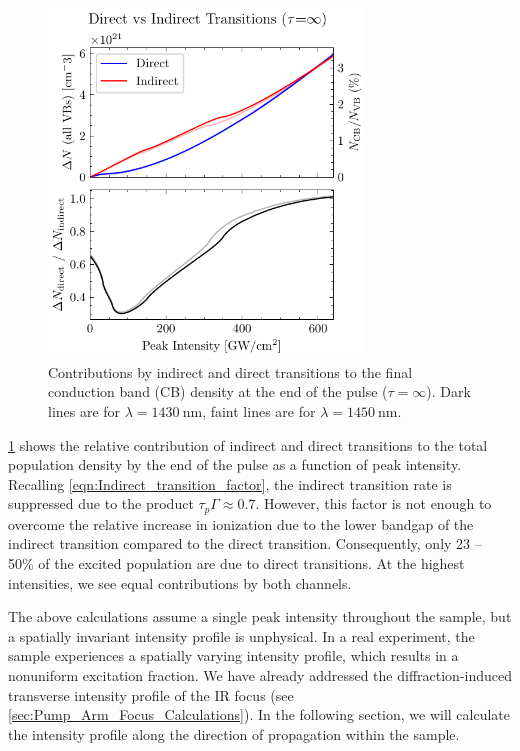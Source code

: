 \begin{figure}
	\centering
	\includegraphics[width=0.75\textwidth]{figures/chap4/Direct_vs_Indirect_Trans.pdf}
	\caption{Contributions by indirect and direct transitions to the final conduction band (CB) density at the end of the pulse ($\tau = \infty$). Dark lines are for $\lambda = 1430 \ \textrm{nm}$, faint lines are for $\lambda = 1450 \ \textrm{nm}$.}
	\label{fig:Direct_vs_Indirect_Trans}
\end{figure}

\cref{fig:Direct_vs_Indirect_Trans} shows the relative contribution of indirect and direct transitions to the total population density by the end of the pulse as a function of peak intensity. Recalling \cref{eqn:Indirect_transition_factor}, the indirect transition rate is suppressed due to the product $\tau_p \Gamma \approx 0.7$. However, this factor is not enough to overcome the relative increase in ionization due to the lower bandgap of the indirect transition compared to the direct transition. Consequently, only {23 -- 50\%} of the excited population are due to direct transitions. At the highest intensities, we see equal contributions by both channels.

The above calculations assume a single peak intensity throughout the sample, but a spatially invariant intensity profile is unphysical. In a real experiment, the sample experiences a spatially varying intensity profile, which results in a nonuniform excitation fraction. We have already addressed the diffraction-induced transverse intensity profile of the IR focus (see \cref{sec:Pump_Arm_Focus_Calculations}). In the following section, we will calculate the intensity profile along the direction of propagation within the sample.

